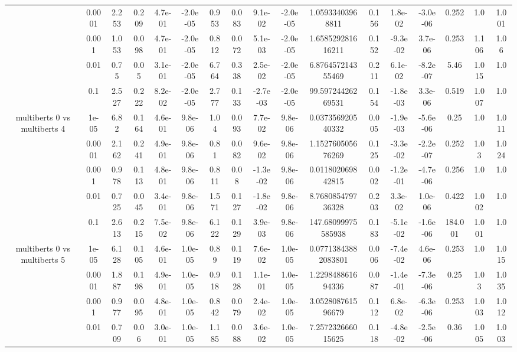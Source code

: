 \begin{tabular}{|c|c|c|c|c|c|c|c|c|c|c|c|c|c|c|c|c|}
 & 0.0001 & 2.253 & 0.209 & 4.7e-01 & -2.0e-05 & 0.953 & 0.083 & 9.1e-02 & -2.0e-05 & 1.05933403968811 & 0.156 & 1.8e-02 & -3.0e-06 & 0.252 & 1.0 & 1.001 \\
 & 0.001 & 1.053 & 0.098 & 4.7e-01 & -2.0e-05 & 0.812 & 0.072 & 5.1e-03 & -2.0e-05 & 1.658529281616211 & 0.152 & -9.3e-02 & 3.7e-06 & 0.253 & 1.106 & 1.06 \\
 & 0.01 & 0.75 & 0.05 & 3.1e-01 & -2.0e-05 & 6.764 & 0.338 & 2.5e-02 & -2.0e-05 & 6.876457214355469 & 0.211 & 6.1e-02 & -8.2e-07 & 5.46 & 1.015 & 1.0 \\
 & 0.1 & 2.527 & 0.222 & 8.2e-02 & -2.0e-05 & 2.777 & 0.133 & -2.7e-03 & -2.0e-05 & 99.59724426269531 & 0.154 & -1.8e-03 & 3.3e-06 & 0.519 & 1.007 & 1.0 \\
\hline
\multirow{5}{*}{multiberts 0 vs multiberts 4} & 1e-05 & 6.82 & 0.164 & 4.6e-01 & 9.8e-06 & 1.04 & 0.093 & 7.7e-02 & 9.8e-06 & 0.037356920540332 & 0.005 & -1.9e-03 & -5.6e-06 & 0.25 & 1.0 & 1.011 \\
 & 0.0001 & 2.162 & 0.241 & 4.9e-01 & 9.8e-06 & 0.81 & 0.082 & 9.6e-02 & 9.8e-06 & 1.152760505676269 & 0.125 & -3.3e-02 & -2.2e-07 & 0.252 & 1.03 & 1.024 \\
 & 0.001 & 0.978 & 0.113 & 4.8e-01 & 9.8e-06 & 0.811 & 0.08 & -1.3e-02 & 9.8e-06 & 0.011802069842815 & 0.002 & -1.2e-01 & -4.7e-06 & 0.256 & 1.0 & 1.0 \\
 & 0.01 & 0.725 & 0.045 & 3.4e-01 & 9.8e-06 & 1.571 & 0.127 & -1.8e-02 & 9.8e-06 & 8.768085479736328 & 0.203 & 3.3e-02 & 1.0e-06 & 0.422 & 1.002 & 1.0 \\
 & 0.1 & 2.613 & 0.215 & 7.5e-02 & 9.8e-06 & 6.122 & 0.129 & 3.9e-03 & 9.8e-06 & 147.68099975585938 & 0.183 & -5.1e-02 & -1.6e-06 & 184.001 & 1.001 & 1.0 \\
\hline
\multirow{5}{*}{multiberts 0 vs multiberts 5} & 1e-05 & 6.128 & 0.105 & 4.6e-01 & 1.0e-05 & 0.89 & 0.119 & 7.6e-02 & 1.0e-05 & 0.07713843882083801 & 0.006 & -7.4e-02 & 4.6e-06 & 0.253 & 1.0 & 1.015 \\
 & 0.0001 & 1.887 & 0.198 & 4.9e-01 & 1.0e-05 & 0.918 & 0.128 & 1.1e-01 & 1.0e-05 & 1.229848861694336 & 0.087 & -1.4e-01 & -7.3e-06 & 0.25 & 1.03 & 1.035 \\
 & 0.001 & 0.977 & 0.095 & 4.8e-01 & 1.0e-05 & 0.842 & 0.079 & 2.4e-02 & 1.0e-05 & 3.052808761596679 & 0.112 & 6.8e-02 & -6.3e-06 & 0.253 & 1.003 & 1.012 \\
 & 0.01 & 0.709 & 0.06 & 3.0e-01 & 1.0e-05 & 1.185 & 0.088 & 3.6e-02 & 1.0e-05 & 7.257232666015625 & 0.118 & -4.8e-02 & -2.5e-06 & 0.36 & 1.005 & 1.003 \\

\end{tabular}
